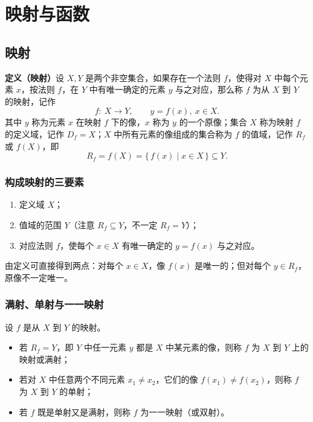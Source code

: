 
\section{映射与函数}

\subsection{映射}

\textbf{定义（映射）}\quad 设 $X,Y$ 是两个非空集合，如果存在一个法则 $f$，使得对 $X$ 中每个元素 $x$，按法则 $f$，在 $Y$ 中有唯一确定的元素 $y$ 与之对应，那么称 $f$ 为从 $X$ 到 $Y$ 的映射，记作
\[
f:\ X\to Y,\qquad y=f(x),\ x\in X .
\]
其中 $y$ 称为元素 $x$ 在映射 $f$ 下的像，$x$ 称为 $y$ 的一个原像；集合 $X$ 称为映射 $f$ 的定义域，记作 $D_f=X$；$X$ 中所有元素的像组成的集合称为 $f$ 的值域，记作 $R_f$ 或 $f(X)$，即
\[
R_f=f(X)=\{\,f(x)\mid x\in X\,\}\subseteq Y .
\]

\subsubsection{构成映射的三要素}
\begin{enumerate}
    \item 定义域 $X$；
    \item 值域的范围 $Y$（注意 $R_f\subseteq Y$，不一定 $R_f=Y$）；
    \item 对应法则 $f$，使每个 $x\in X$ 有唯一确定的 $y=f(x)$ 与之对应。
\end{enumerate}

\noindent 由定义可直接得到两点：对每个 $x\in X$，像 $f(x)$ 是唯一的；但对每个 $y\in R_f$，原像不一定唯一。

\subsubsection{满射、单射与一一映射}
设 $f$ 是从 $X$ 到 $Y$ 的映射。
\begin{itemize}
    \item 若 $R_f=Y$，即 $Y$ 中任一元素 $y$ 都是 $X$ 中某元素的像，则称 $f$ 为 $X$ 到 $Y$ 上的映射或满射；
    \item 若对 $X$ 中任意两个不同元素 $x_1\neq x_2$，它们的像 $f(x_1)\neq f(x_2)$，则称 $f$ 为 $X$ 到 $Y$ 的单射；
    \item 若 $f$ 既是单射又是满射，则称 $f$ 为一一映射（或双射）。
\end{itemize}

